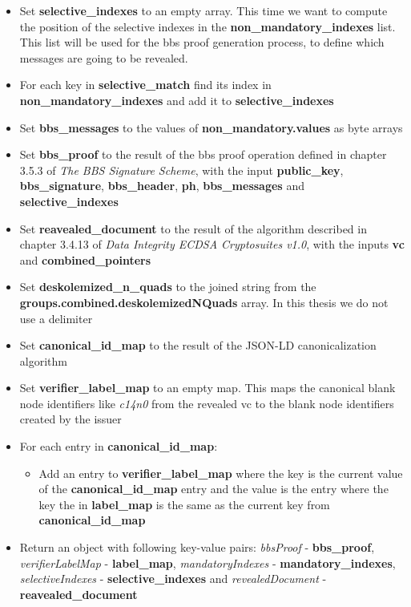 \documentclass[
	a4paper               %
	,bibliography=totoc   %
	,listof=totoc         %
	,monolingual
]{bfhthesis}              %
\begin{document}
\begin{itemize}
	\item Set \textbf{selective\_indexes} to an empty array. This time we want to compute the position of the selective indexes in the \textbf{non\_mandatory\_indexes} list. This list will be used for the bbs proof generation process, to define which messages are going to be revealed.
	\item For each key in \textbf{selective\_match} find its index in \textbf{non\_mandatory\_indexes} and add it to \textbf{selective\_indexes}
	\item Set \textbf{bbs\_messages} to the values of \textbf{non\_mandatory.values} as byte arrays
	\item Set \textbf{bbs\_proof} to the result of the bbs proof operation defined in chapter 3.5.3 of \textit{The BBS Signature Scheme}\cite{bbs-signature-scheme}, with the input \textbf{public\_key}, \textbf{bbs\_signature}, \textbf{bbs\_header}, \textbf{ph}, \textbf{bbs\_messages} and \textbf{selective\_indexes}
	\item Set \textbf{reavealed\_document} to the result of the algorithm described in chapter 3.4.13 of \textit{Data Integrity ECDSA Cryptosuites v1.0}\cite{ecdsa}, with the inputs \textbf{vc} and \textbf{combined\_pointers}
	\item Set \textbf{deskolemized\_n\_quads} to the joined string from the \textbf{groups.combined.deskolemizedNQuads} array. In this thesis we do not use a delimiter
	\item Set \textbf{canonical\_id\_map} to the result of the JSON-LD canonicalization algorithm
	\item Set \textbf{verifier\_label\_map} to an empty map. This maps the canonical blank node identifiers like \textit{c14n0} from the revealed vc to the blank node identifiers created by the issuer
	\item For each entry in \textbf{canonical\_id\_map}:
	\begin{itemize}
		\item Add an entry to \textbf{verifier\_label\_map} where the key is the current value of the \textbf{canonical\_id\_map} entry and the value is the entry where the key the in \textbf{label\_map} is the same as the current key from \textbf{canonical\_id\_map}
	\end{itemize}
	\item Return an object with following key-value pairs: \textit{bbsProof} - \textbf{bbs\_proof}, \textit{verifierLabelMap} - \textbf{label\_map}, \textit{mandatoryIndexes} - \textbf{mandatory\_indexes}, \textit{selectiveIndexes} - \textbf{selective\_indexes} and \textit{revealedDocument} - \textbf{reavealed\_document}
\end{itemize}
\end{document}
